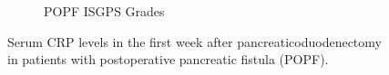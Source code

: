 \begin{figure}[htbp]
\begin{subfigure}{0.45\textwidth}
		\caption{POPF ISGPS Grades}
		\label{fig:crp_comp_crp_popf_isgps}
	\end{subfigure}
	
	\caption{Serum CRP levels in the first week after pancreaticoduodenectomy in patients with postoperative pancreatic fistula (POPF).}
	\label{fig:crp_comp_crp_popf}
	
\end{figure}






